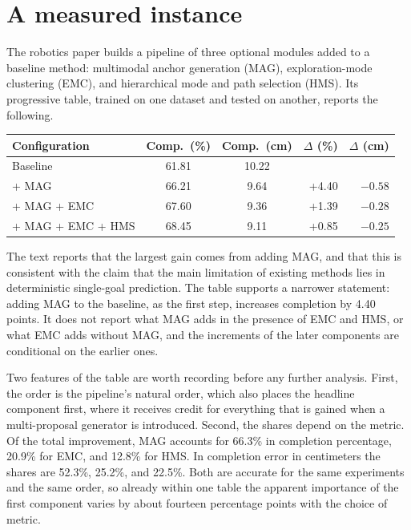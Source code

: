 \documentclass[11pt]{article}
\theoremstyle{plain}
\theoremstyle{remark}
\begin{document}
\section{A measured instance}\label{sec:paper}

The robotics paper builds a pipeline of three optional modules added to a baseline method: multimodal anchor generation (MAG), exploration-mode clustering (EMC), and hierarchical mode and path selection (HMS). Its progressive table, trained on one dataset and tested on another, reports the following.

\begin{center}
\small
\begin{tabular}{lccrr}
\toprule
Configuration & Comp.\ (\%) & Comp.\ (cm) & $\Delta$ (\%) & $\Delta$ (cm)\\
\midrule
Baseline & 61.81 & 10.22 & & \\
+ MAG & 66.21 & 9.64 & +4.40 & $-0.58$\\
+ MAG + EMC & 67.60 & 9.36 & +1.39 & $-0.28$\\
+ MAG + EMC + HMS & 68.45 & 9.11 & +0.85 & $-0.25$\\
\bottomrule
\end{tabular}
\end{center}

The text reports that the largest gain comes from adding MAG, and that this is consistent with the claim that the main limitation of existing methods lies in deterministic single-goal prediction. The table supports a narrower statement: adding MAG to the baseline, as the first step, increases completion by 4.40 points. It does not report what MAG adds in the presence of EMC and HMS, or what EMC adds without MAG, and the increments of the later components are conditional on the earlier ones.

Two features of the table are worth recording before any further analysis. First, the order is the pipeline's natural order, which also places the headline component first, where it receives credit for everything that is gained when a multi-proposal generator is introduced. Second, the shares depend on the metric. Of the total improvement, MAG accounts for 66.3\% in completion percentage, 20.9\% for EMC, and 12.8\% for HMS. In completion error in centimeters the shares are 52.3\%, 25.2\%, and 22.5\%. Both are accurate for the same experiments and the same order, so already within one table the apparent importance of the first component varies by about fourteen percentage points with the choice of metric.
\end{document}
